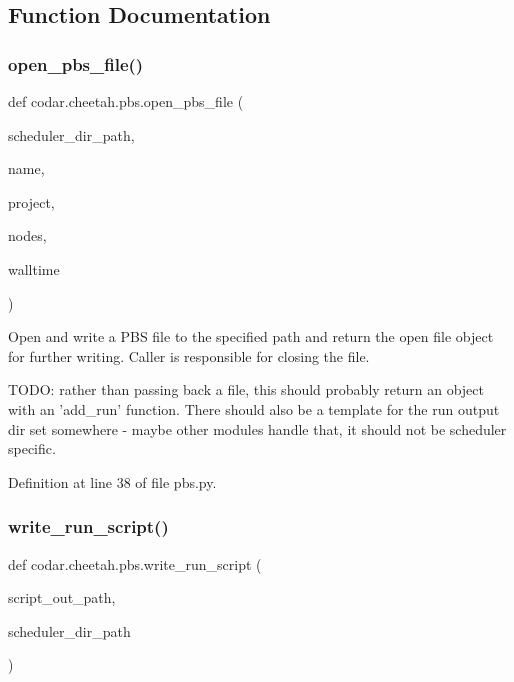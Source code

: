 \subsection{Function Documentation}
\mbox{\label{namespacecodar_1_1cheetah_1_1pbs_a2d1652f1349a664f93598c2ea3c20896}} 
\subsubsection{\texorpdfstring{open\+\_\+pbs\+\_\+file()}{open\_pbs\_file()}}
{\footnotesize\ttfamily def codar.\+cheetah.\+pbs.\+open\+\_\+pbs\+\_\+file (\begin{DoxyParamCaption}\item[{}]{scheduler\+\_\+dir\+\_\+path,  }\item[{}]{name,  }\item[{}]{project,  }\item[{}]{nodes,  }\item[{}]{walltime }\end{DoxyParamCaption})}

\begin{DoxyVerb}Open and write a PBS file to the specified path and return the open file
object for further writing. Caller is responsible for closing the file.

TODO: rather than passing back a file, this should probably return
an object with an 'add_run' function. There should also be a template
for the run output dir set somewhere - maybe other modules handle that,
it should not be scheduler specific.
\end{DoxyVerb}
 

Definition at line 38 of file pbs.\+py.

\mbox{\label{namespacecodar_1_1cheetah_1_1pbs_a911aa8a83bd8b0fd8f750ea66d410851}} 
\subsubsection{\texorpdfstring{write\+\_\+run\+\_\+script()}{write\_run\_script()}}
{\footnotesize\ttfamily def codar.\+cheetah.\+pbs.\+write\+\_\+run\+\_\+script (\begin{DoxyParamCaption}\item[{}]{script\+\_\+out\+\_\+path,  }\item[{}]{scheduler\+\_\+dir\+\_\+path }\end{DoxyParamCaption})}


